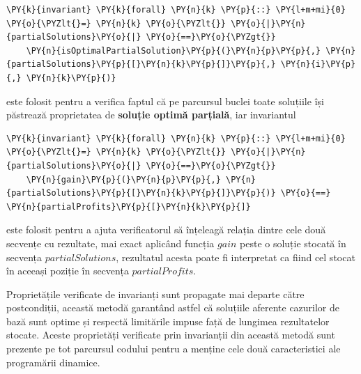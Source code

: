 \begin{sloppypar}
    \begin{Verbatim}[commandchars=\\\{\}]
\PY{k}{invariant} \PY{k}{forall} \PY{n}{k} \PY{p}{::} \PY{l+m+mi}{0} \PY{o}{\PYZlt{}=} \PY{n}{k} \PY{o}{\PYZlt{}} \PY{o}{|}\PY{n}{partialSolutions}\PY{o}{|} \PY{o}{==}\PY{o}{\PYZgt{}} 
    \PY{n}{isOptimalPartialSolution}\PY{p}{(}\PY{n}{p}\PY{p}{,} \PY{n}{partialSolutions}\PY{p}{[}\PY{n}{k}\PY{p}{]}\PY{p}{,} \PY{n}{i}\PY{p}{,} \PY{n}{k}\PY{p}{)}
\end{Verbatim}
    este folosit pentru a verifica faptul că pe parcursul buclei toate soluțiile își păstrează proprietatea de \textbf{soluție optimă parțială}, iar invariantul 
    \begin{Verbatim}[commandchars=\\\{\}]
\PY{k}{invariant} \PY{k}{forall} \PY{n}{k} \PY{p}{::} \PY{l+m+mi}{0} \PY{o}{\PYZlt{}=} \PY{n}{k} \PY{o}{\PYZlt{}} \PY{o}{|}\PY{n}{partialSolutions}\PY{o}{|} \PY{o}{==}\PY{o}{\PYZgt{}} 
    \PY{n}{gain}\PY{p}{(}\PY{n}{p}\PY{p}{,} \PY{n}{partialSolutions}\PY{p}{[}\PY{n}{k}\PY{p}{]}\PY{p}{)} \PY{o}{==} \PY{n}{partialProfits}\PY{p}{[}\PY{n}{k}\PY{p}{]}
\end{Verbatim}
    este folosit pentru a ajuta verificatorul să înțeleagă relația dintre cele două secvențe cu rezultate, mai exact aplicând funcția $gain$ peste o soluție stocată în secvența $partialSolutions$, rezultatul acesta poate fi interpretat ca fiind cel stocat în aceeași poziție în secvența $partialProfits$.
    \par Proprietățile verificate de invarianți sunt propagate mai departe către postcondiții, această metodă garantând astfel că soluțiile aferente cazurilor de bază sunt optime și respectă limitările impuse față de lungimea rezultatelor stocate. Aceste proprietăți verificate prin invarianții din această metodă sunt prezente pe tot parcursul codului pentru a menține cele două caracteristici ale programării dinamice. \\ \par


\end{sloppypar}
